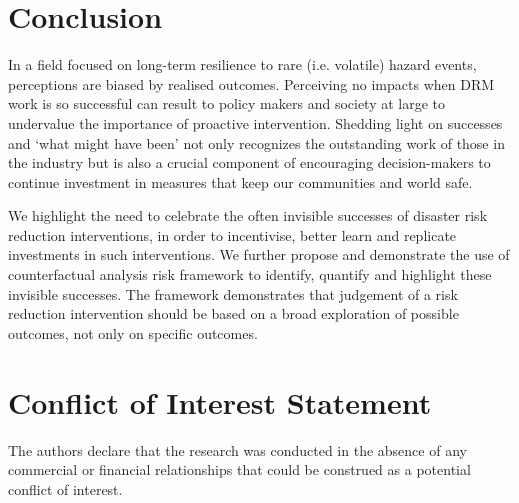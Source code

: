 \documentclass[utf8]{frontiersSCNS} %
\begin{document}
\section{Conclusion}
\label{section-conclusion}

In a field focused on long-term resilience to rare (i.e. volatile) hazard events, perceptions are biased by realised outcomes. Perceiving no impacts when DRM work is so successful can result to policy makers and society at large to undervalue the importance of proactive intervention. Shedding light on successes and ‘what might have been’ not only recognizes the outstanding work of those in the industry but is also a crucial component of encouraging decision-makers to continue investment in measures that keep our communities and world safe. 

We highlight the need to celebrate the often invisible successes of disaster risk reduction interventions, in order to incentivise, better learn and replicate investments in such interventions. We further propose and demonstrate the use of counterfactual analysis risk framework to identify, quantify and highlight these invisible successes. The framework demonstrates that judgement of a risk reduction intervention should be based on a broad exploration of possible outcomes, not only on specific outcomes.



\section*{Conflict of Interest Statement}

The authors declare that the research was conducted in the absence of any commercial or financial relationships that could be construed as a potential conflict of interest.

\end{document}
